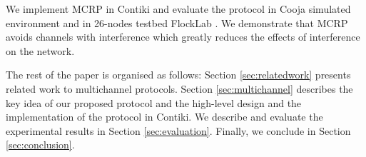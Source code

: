 


We implement MCRP in Contiki and evaluate the protocol in Cooja simulated environment and in 26-nodes testbed FlockLab \cite{flocklab}. We demonstrate that MCRP avoids channels with interference which greatly reduces the effects of interference on the network.

The rest of the paper is organised as follows: Section \ref{sec:relatedwork} presents related work to multichannel protocols. Section \ref{sec:multichannel} describes the key idea of our proposed protocol and the high-level design and the implementation of the protocol in Contiki. We describe and evaluate the experimental results in Section \ref{sec:evaluation}. Finally, we conclude in Section \ref{sec:conclusion}.